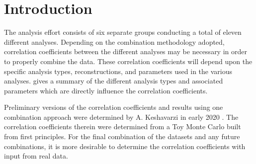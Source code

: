 
\graphicspath{{Body/Figures/}}

\section{Introduction}

The \Rone \wa analysis effort consists of six separate groups conducting a total of eleven different analyses. Depending on the combination methodology adopted, correlation coefficients between the different analyses may be necessary in order to properly combine the data. These correlation coefficients will depend upon the specific analysis types, reconstructions, and parameters used in the various analyses.  gives a summary of the different analysis types and associated parameters which are directly influence the correlation coefficients. 

Preliminary versions of the correlation coefficients and results using one combination approach were determined by A. Keshavarzi in early 2020 \cite{AlexCombinationNote}. The correlation coefficients therein were determined from a Toy Monte Carlo built from first principles. For the final combination of the \Rone datasets and any future combinations, it is more desirable to determine the correlation coefficients with input from real data. 



